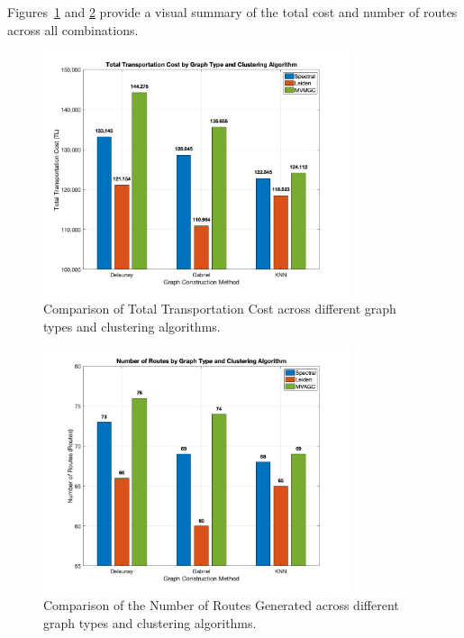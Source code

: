 Figures~\ref{fig:cost_comparison} and \ref{fig:routes_comparison} provide a visual summary of the total cost and number of routes across all combinations. 

\begin{figure}[h]
    \centering
    \includegraphics[width=0.8\textwidth]{img/cost_comparison}
    \caption{Comparison of Total Transportation Cost across different graph types and clustering algorithms.}
    \label{fig:cost_comparison}
\end{figure}

\begin{figure}[h]
    \centering
    \includegraphics[width=0.8\textwidth]{img/route_count_comparison}
    \caption{Comparison of the Number of Routes Generated across different graph types and clustering algorithms.}
    \label{fig:routes_comparison}
\end{figure}

